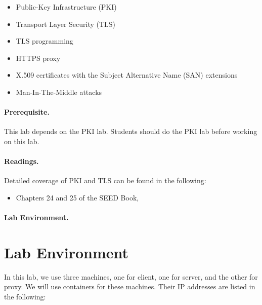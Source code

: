 \begin{itemize}[noitemsep]
\item Public-Key Infrastructure (PKI)
\item Transport Layer Security (TLS)
\item TLS programming
\item HTTPS proxy 
\item X.509 certificates with the Subject Alternative Name (SAN) extensions
\item Man-In-The-Middle attacks
\end{itemize}


\paragraph{Prerequisite.} This lab depends on the PKI lab. Students should 
do the PKI lab before working on this lab. 

\paragraph{Readings.}
Detailed coverage of PKI and TLS can be found in the following:

\begin{itemize}
\item Chapters 24 and 25 of the SEED Book, \seedbook
\end{itemize}


\paragraph{Lab Environment.} \seedenvironmentB




\newpage

\section{Lab Environment}

In this lab, we use three machines, one for client, one for server,
and the other for proxy. We will use containers for these machines.  
Their IP addresses are listed in the following:


